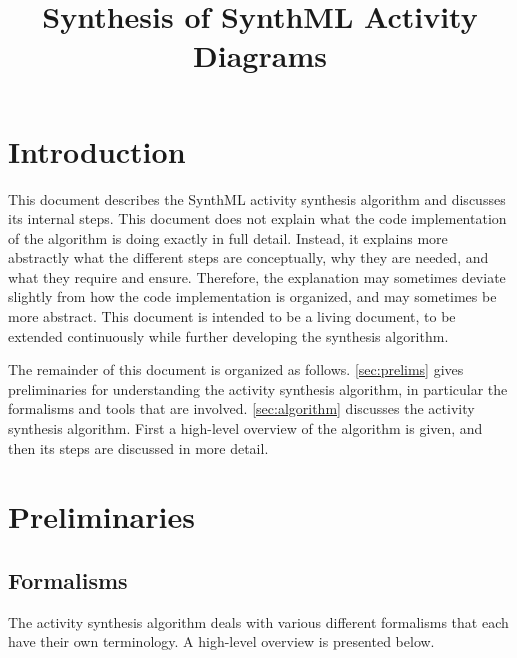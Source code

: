 \documentclass{article}
\title{Synthesis of SynthML Activity Diagrams}
\theoremstyle{definition}
\begin{document}
\maketitle

\section{Introduction}
\label{sec:intro}

This document describes the SynthML activity synthesis algorithm and discusses its internal steps.
This document does not explain what the code implementation of the algorithm is doing exactly in full detail.
Instead, it explains more abstractly what the different steps are conceptually, why they are needed, and what they require and ensure.
Therefore, the explanation may sometimes deviate slightly from how the code implementation is organized, and may sometimes be more abstract.
This document is intended to be a living document, to be extended continuously while further developing the synthesis algorithm.

The remainder of this document is organized as follows.
\autoref{sec:prelims} gives preliminaries for understanding the activity synthesis algorithm, in particular the formalisms and tools that are involved.
\autoref{sec:algorithm} discusses the activity synthesis algorithm.
First a high-level overview of the algorithm is given, and then its steps are discussed in more detail.

\section{Preliminaries}
\label{sec:prelims}

\subsection{Formalisms}
\label{sec:prelims:formalisms}

The activity synthesis algorithm deals with various different formalisms that each have their own terminology.
A high-level overview is presented below.
\end{document}
